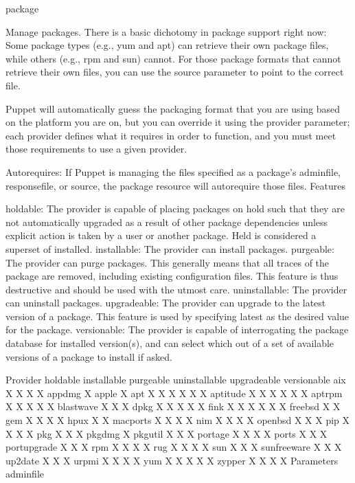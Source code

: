 package

Manage packages. There is a basic dichotomy in package support right now: Some package types (e.g., yum and apt) can retrieve their own package files, while others (e.g., rpm and sun) cannot. For those package formats that cannot retrieve their own files, you can use the source parameter to point to the correct file.

Puppet will automatically guess the packaging format that you are using based on the platform you are on, but you can override it using the provider parameter; each provider defines what it requires in order to function, and you must meet those requirements to use a given provider.

Autorequires: If Puppet is managing the files specified as a package’s adminfile, responsefile, or source, the package resource will autorequire those files.
Features

    holdable: The provider is capable of placing packages on hold such that they are not automatically upgraded as a result of other package dependencies unless explicit action is taken by a user or another package. Held is considered a superset of installed.
    installable: The provider can install packages.
    purgeable: The provider can purge packages. This generally means that all traces of the package are removed, including existing configuration files. This feature is thus destructive and should be used with the utmost care.
    uninstallable: The provider can uninstall packages.
    upgradeable: The provider can upgrade to the latest version of a package. This feature is used by specifying latest as the desired value for the package.
    versionable: The provider is capable of interrogating the package database for installed version(s), and can select which out of a set of available versions of a package to install if asked.

Provider 	holdable 	installable 	purgeable 	uninstallable 	upgradeable 	versionable
aix 	  	X 	  	X 	X 	X
appdmg 	  	X 	  	  	  	 
apple 	  	X 	  	  	  	 
apt 	X 	X 	X 	X 	X 	X
aptitude 	X 	X 	X 	X 	X 	X
aptrpm 	  	X 	X 	X 	X 	X
blastwave 	  	X 	  	X 	X 	 
dpkg 	X 	X 	X 	X 	X 	 
fink 	X 	X 	X 	X 	X 	X
freebsd 	  	X 	  	X 	  	 
gem 	  	X 	  	X 	X 	X
hpux 	  	X 	  	X 	  	 
macports 	  	X 	  	X 	X 	X
nim 	  	X 	  	X 	X 	X
openbsd 	  	X 	  	X 	  	X
pip 	  	X 	  	X 	X 	X
pkg 	  	X 	  	X 	X 	 
pkgdmg 	  	X 	  	  	  	 
pkgutil 	  	X 	  	X 	X 	 
portage 	  	X 	  	X 	X 	X
ports 	  	X 	  	X 	X 	 
portupgrade 	  	X 	  	X 	X 	 
rpm 	  	X 	  	X 	X 	X
rug 	  	X 	  	X 	X 	X
sun 	  	X 	  	X 	X 	 
sunfreeware 	  	X 	  	X 	X 	 
up2date 	  	X 	  	X 	X 	 
urpmi 	  	X 	  	X 	X 	X
yum 	  	X 	X 	X 	X 	X
zypper 	  	X 	  	X 	X 	X
Parameters
adminfile

